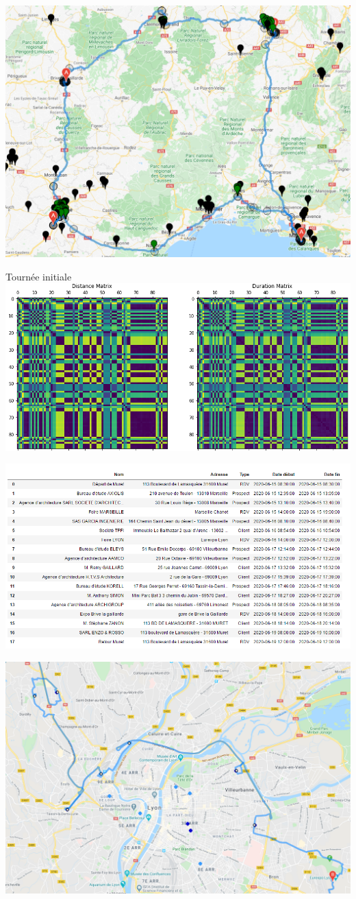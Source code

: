 \documentclass[french]{beamer}
\begin{document}
\begin{frame}
\includegraphics[width=0.9\textwidth>]{Circles2}
\end{frame}

\begin{frame}
\begin{block}{Tournée initiale}
\includegraphics[width=0.9\textwidth>]{distance matrix}
\end{block}
\end{frame}

\begin{frame}
\includegraphics[width=0.9\textwidth>]{completion programme}
\end{frame}
\begin{frame}
\includegraphics[width=0.9\textwidth>]{completion lyon}
\end{frame}
\end{document}
